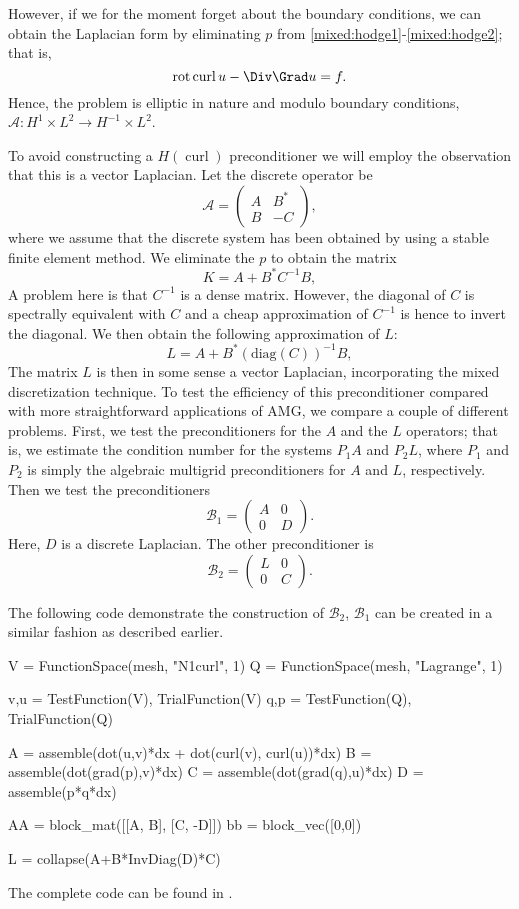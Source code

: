 However, if we for the moment forget about the boundary conditions,
we can obtain the Laplacian form  by eliminating $p$
from \eqref{mixed:hodge1}-\eqref{mixed:hodge2}; that is,
\[
\mop{rot} \mop{curl} u - \Div \Grad u = f .
\]
Hence, the problem is elliptic
in nature and modulo boundary conditions,  $\mathcal{A}: H^1 \times L^2 \rightarrow  H^{-1} \times L^2$.

To avoid constructing a $H(\operatorname{curl})$ preconditioner we will employ
the observation that this is a vector Laplacian.
Let the discrete operator be
\[
\mathcal{A}  =
\begin{pmatrix} A & B^* \\ B & -C \end{pmatrix},
\]
where we assume that the discrete system has been obtained by using a stable finite
element method. We eliminate the $p$ to obtain the matrix
\[
K  = A +  B^* C^{-1} B,
\]
A problem here is that $C^{-1}$ is a dense matrix. However, the diagonal of $C$ is spectrally equivalent with $C$ and a cheap approximation of $C^{-1}$ is hence
to invert the diagonal. We then obtain the following approximation of $L$:
\[
L  = A +  B^* (\mathrm{diag}(C))^{-1} B,
\]
The matrix $L$ is then in some sense a vector Laplacian,
incorporating the mixed discretization technique.  To test the
efficiency of this preconditioner compared with more straightforward
applications of AMG, we compare a couple of different problems.
First, we test the preconditioners for the $A$ and the $L$
operators; that is, we estimate the condition number for the systems
$P_1 A$ and $P_2 L$, where $P_1$ and $P_2$ is simply the algebraic
multigrid preconditioners for $A$ and $L$, respectively.  Then we
test the preconditioners
\[
\mathcal{B}_1  =
\begin{pmatrix} A & 0  \\ 0  & D \end{pmatrix}.
\]
Here, $D$ is a discrete Laplacian. The other preconditioner is
\[
\mathcal{B}_2  =
\begin{pmatrix} L & 0  \\ 0  & C \end{pmatrix}.
\]

The following code demonstrate the construction of $\mathcal{B}_2$,
$\mathcal{B}_1$ can be created in a similar fashion as described earlier.
\begin{python}
V = FunctionSpace(mesh, "N1curl", 1)
Q = FunctionSpace(mesh, "Lagrange", 1)

v,u = TestFunction(V), TrialFunction(V)
q,p = TestFunction(Q), TrialFunction(Q)

A = assemble(dot(u,v)*dx + dot(curl(v), curl(u))*dx)
B = assemble(dot(grad(p),v)*dx)
C = assemble(dot(grad(q),u)*dx)
D = assemble(p*q*dx)

AA = block_mat([[A,  B],
                [C, -D]])
bb = block_vec([0,0])

L = collapse(A+B*InvDiag(D)*C)
\end{python}
The complete code can be found in .

